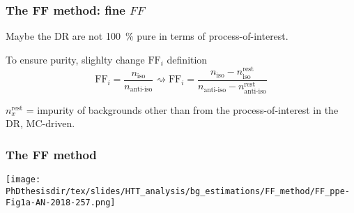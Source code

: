 \begin{frame}
\frametitle{The FF method: fine $\mathit{FF}$}

\manip Maybe the DR are not \SI{100}{\%} pure in terms of process-of-interest.

\manip To ensure purity, slighlty change $\mathrm{FF}_i$ definition
\begin{equation*}
\mathrm{FF}_i = \frac{n_\text{iso}}{n_\text{anti-iso}}
\rightsquigarrow
\mathrm{FF}_i = \frac{n_\text{iso} - n_\text{iso}^\text{rest}}{n_\text{anti-iso} - n_\text{anti-iso}^\text{rest}}
\end{equation*}
\begin{center}
{\small $n_x^\text{rest}$ = impurity of backgrounds other than from the process-of-interest in the DR, MC-driven.}
\end{center}
\end{frame}

\begin{frame}
\frametitle{The FF method}
\begin{center}
\texttt{[image: \\PhDthesisdir/tex/slides/HTT\_analysis/bg\_estimations/FF\_method/FF\_ppe-Fig1a-AN-2018-257.png]}
\end{center}
\end{frame}